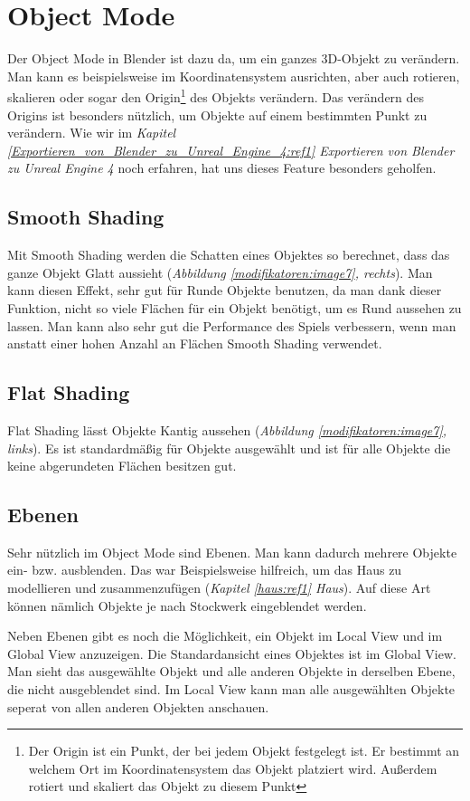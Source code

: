 \section{Object Mode}
Der Object Mode in Blender ist dazu da, um ein ganzes 3D-Objekt zu verändern. Man kann es beispielsweise im Koordinatensystem ausrichten, aber
auch rotieren, skalieren oder sogar den Origin\footnote{Der Origin ist ein Punkt, der bei jedem Objekt festgelegt ist. Er bestimmt an welchem Ort im Koordinatensystem das Objekt platziert wird. Außerdem rotiert und skaliert das Objekt zu diesem Punkt}
des Objekts verändern. Das verändern des Origins ist besonders nützlich, um Objekte auf einem bestimmten Punkt zu verändern.
Wie wir im \textit{Kapitel \ref{Exportieren_von_Blender_zu_Unreal_Engine_4:ref1} \dq Exportieren von Blender zu Unreal Engine 4\dq} noch erfahren, hat uns dieses Feature besonders geholfen.

\subsection{Smooth Shading}
\label{objectMode:smoothshading}
Mit Smooth Shading werden die Schatten eines Objektes so berechnet, dass das ganze Objekt Glatt aussieht (\textit{Abbildung \ref{modifikatoren:image7}, rechts}).\citep{smoothshading:link}
Man kann diesen Effekt, sehr gut für Runde Objekte benutzen, da man dank dieser Funktion, nicht so viele Flächen für ein Objekt benötigt, um
es Rund aussehen zu lassen. Man kann also sehr gut die Performance des Spiels verbessern, wenn man anstatt einer hohen Anzahl an Flächen Smooth Shading verwendet.

\subsection{Flat Shading}
Flat Shading lässt Objekte Kantig aussehen (\textit{Abbildung \ref{modifikatoren:image7}, links}).
Es ist standardmäßig für Objekte ausgewählt und ist für alle Objekte die keine abgerundeten Flächen besitzen gut.

\subsection{Ebenen}
Sehr nützlich im Object Mode sind Ebenen. Man kann dadurch mehrere Objekte ein- bzw. ausblenden.
Das war Beispielsweise hilfreich, um das Haus zu modellieren und zusammenzufügen (\textit{Kapitel \ref{haus:ref1} \dq Haus\dq}).
Auf diese Art können nämlich Objekte je nach Stockwerk eingeblendet werden.

Neben Ebenen gibt es noch die Möglichkeit, ein Objekt im Local View und im Global View anzuzeigen.
Die Standardansicht eines Objektes ist im Global View. Man sieht das ausgewählte Objekt und alle anderen Objekte in derselben Ebene, die nicht ausgeblendet sind.
Im Local View kann man alle ausgewählten Objekte seperat von allen anderen Objekten anschauen.
